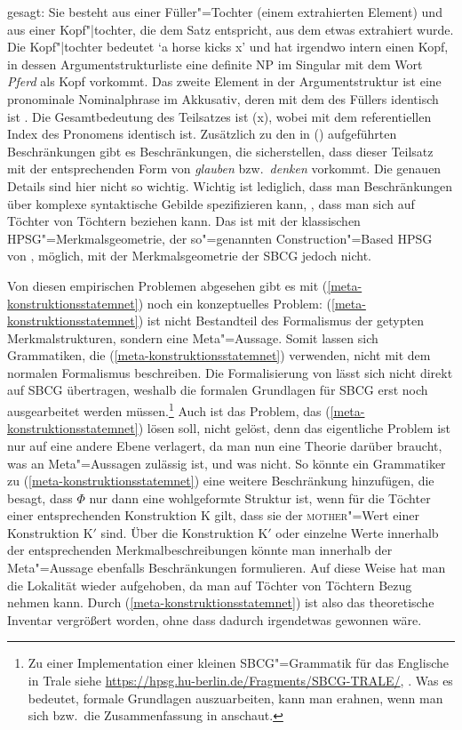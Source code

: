 gesagt: Sie besteht aus einer Füller"=Tochter (einem extrahierten Element) und aus einer
Kopf"|tochter, die dem Satz entspricht, aus dem etwas extrahiert wurde. Die Kopf"|tochter bedeutet
`\textrm{a horse kicks x}' und hat irgendwo intern einen Kopf, in dessen Argumentstrukturliste eine definite
NP im Singular mit dem Wort \emph{Pferd} als Kopf vorkommt. Das zweite Element in der
Argumentstruktur ist eine pronominale Nominalphrase im Akkusativ, deren \localw mit dem des Füllers
identisch ist . Die Gesamtbedeutung des Teilsatzes ist (x),
wobei  mit dem referentiellen Index des Pronomens identisch ist. Zusätzlich zu den in
() aufgeführten Beschränkungen gibt es Beschränkungen, die sicherstellen, dass dieser
Teilsatz mit der entsprechenden Form von \emph{glauben} bzw.\ \emph{denken} vorkommt. Die genauen
Details sind hier nicht so wichtig. Wichtig ist lediglich, dass man Beschränkungen über komplexe
syntaktische Gebilde spezifizieren kann, \dash, dass man sich auf Töchter von Töchtern beziehen
kann. Das ist mit der klassischen HPSG"=Merkmalsgeometrie, der so"=genannten Construction"=Based
HPSG von \citet{Sag97a}, möglich, mit der Merkmalsgeometrie der SBCG jedoch nicht. 

Von diesen empirischen Problemen abgesehen gibt es mit (\ref{meta-konstruktionsstatemnet}) noch ein konzeptuelles Problem:
(\ref{meta-konstruktionsstatemnet}) ist nicht Bestandteil des Formalismus der getypten Merkmalstrukturen, sondern eine
Meta"=Aussage. Somit lassen sich Grammatiken, die (\ref{meta-konstruktionsstatemnet}) verwenden, 
nicht mit dem normalen Formalismus beschreiben. Die Formalisierung von \citet{Richter2004a-u} lässt sich
nicht direkt auf SBCG übertragen, weshalb die formalen Grundlagen für SBCG erst noch
ausgearbeitet werden müssen.\footnote{%
Zu einer Implementation einer kleinen SBCG"=Grammatik für das Englische in Trale siehe
\url{https://hpsg.hu-berlin.de/Fragments/SBCG-TRALE/}, \mytoday. Was es bedeutet, formale Grundlagen
auszuarbeiten, kann man erahnen, wenn man sich  bzw.\ die Zusammenfassung in
 anschaut.
}
Auch ist das Problem, das (\ref{meta-konstruktionsstatemnet}) lösen soll, nicht gelöst, denn
das eigentliche Problem ist nur auf eine andere Ebene verlagert, da man nun eine Theorie
darüber braucht, was an Meta"=Aussagen zulässig ist, und was nicht. So könnte ein Grammatiker zu (\ref{meta-konstruktionsstatemnet})
eine weitere Beschränkung hinzufügen, die besagt, dass $\Phi$ nur dann eine wohlgeformte Struktur
ist, wenn für die Töchter einer entsprechenden Konstruktion K gilt, dass sie der \textsc{mother}"=Wert
einer Konstruktion K$'$ sind. Über die Konstruktion K$'$ oder einzelne Werte innerhalb der entsprechenden
Merkmalbeschreibungen könnte man innerhalb der Meta"=Aussage ebenfalls Beschränkungen formulieren.
Auf diese Weise hat man die Lokalität wieder aufgehoben, da man auf Töchter von Töchtern Bezug nehmen kann.
Durch (\ref{meta-konstruktionsstatemnet}) ist also das theoretische Inventar vergrößert worden,
ohne dass dadurch irgendetwas gewonnen wäre.


